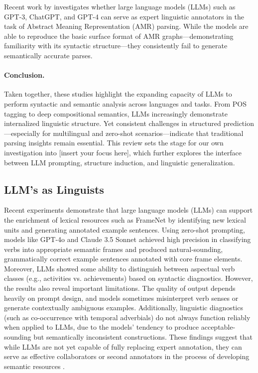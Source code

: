 Recent work by \cite{ettinger2023expert} investigates whether large language models (LLMs) such as GPT-3, ChatGPT, and GPT-4 can serve as expert linguistic annotators in the task of Abstract Meaning Representation (AMR) parsing. While the models are able to reproduce the basic surface format of AMR graphs—demonstrating familiarity with its syntactic structure—they consistently fail to generate semantically accurate parses.

\paragraph{Conclusion.} Taken together, these studies highlight the expanding capacity of LLMs to perform syntactic and semantic analysis across languages and tasks. From POS tagging to deep compositional semantics, LLMs increasingly demonstrate internalized linguistic structure. Yet consistent challenges in structured prediction—especially for multilingual and zero-shot scenarios—indicate that traditional parsing insights remain essential. This review sets the stage for our own investigation into [insert your focus here], which further explores the interface between LLM prompting, structure induction, and linguistic generalization.

\subsection{LLM's as Linguists}
Recent experiments demonstrate that large language models (LLMs) can support the enrichment of lexical resources such as FrameNet by identifying new lexical units and generating annotated example sentences. Using zero-shot prompting, models like GPT-4o and Claude 3.5 Sonnet achieved high precision in classifying verbs into appropriate semantic frames and produced natural-sounding, grammatically correct example sentences annotated with core frame elements. Moreover, LLMs showed some ability to distinguish between aspectual verb classes (e.g., activities vs. achievements) based on syntactic diagnostics. However, the results also reveal important limitations. The quality of output depends heavily on prompt design, and models sometimes misinterpret verb senses or generate contextually ambiguous examples. Additionally, linguistic diagnostics (such as co-occurrence with temporal adverbials) do not always function reliably when applied to LLMs, due to the models' tendency to produce acceptable-sounding but semantically inconsistent constructions. These findings suggest that while LLMs are not yet capable of fully replacing expert annotation, they can serve as effective collaborators or second annotators in the process of developing semantic resources \citep{koeva2024}.

